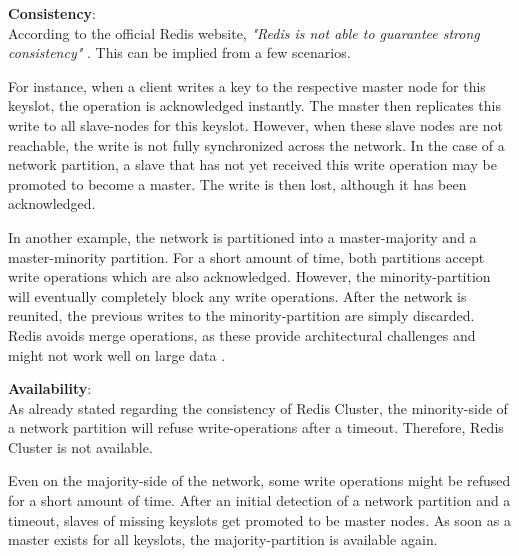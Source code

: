 \begin{description}
    \item \textbf{Consistency}:\\
        According to the official Redis website, \textit{"Redis is not able to
        guarantee strong consistency"} \parencite{redis:clusterTutorial}. This can be implied
        from a few scenarios.

        For instance, when a client writes a key to the respective master node
        for this keyslot, the operation is acknowledged instantly. The master then
        replicates this write to all slave-nodes for this keyslot. However, when these
        slave nodes are not reachable, the write is not fully synchronized across the
        network. In the case of a network partition, a slave that has not yet received
        this write operation may be promoted to become a master. The write is then lost,
        although it has been acknowledged. \parencite{redis:clusterTutorial}

	In another example, the network is partitioned into a master-majority and
        a master-minority partition. For a short amount of time, both partitions accept
        write operations which are also acknowledged. However, the minority-partition
        will eventually completely block any write operations. After the network is
        reunited, the previous writes to the minority-partition are simply discarded.
        Redis avoids merge operations, as these provide architectural challenges and
        might not work well on large data \parencite{redis:clusterSpecification}.
        \cite{redis:clusterTutorial}

    \item \textbf{Availability}:\\
	As already stated regarding the consistency of Redis Cluster, the
        minority-side of a network partition will refuse write-operations after a
        timeout. Therefore, Redis Cluster is not available.
        \parencite{redis:clusterSpecification}

	Even on the majority-side of the network, some write operations might be
        refused for a short amount of time. After an initial detection of a network
        partition and a timeout, slaves of missing keyslots get promoted to be master
        nodes. As soon as a master exists for all keyslots, the majority-partition is
        available again. \parencite{redis:clusterSpecification}
\end{description}

